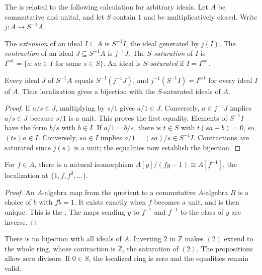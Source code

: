 The  is related to the
following calculation for arbitrary ideals. Let $A$ be commutative and
unital, and let $S$ contain $1$ and be multiplicatively closed.
Write $j:A\to S^{-1}A$.

\begin{definition}\label{ideal-extension-contraction}
The \emph{extension} of an ideal $I\subseteq A$ is $S^{-1}I$, the ideal
generated by $j(I)$. The \emph{contraction} of an ideal $J\subseteq S^{-1}A$
is $j^{-1}J$. The \emph{$S$-saturation} of $I$ is
$I^{\mathrm{sat}}=\{a:sa\in I\text{ for some }s\in S\}$.
An ideal is \emph{$S$-saturated} if $I=I^{\mathrm{sat}}$.
\end{definition}
\begin{proposition}\label{localized-ideals}
Every ideal $J$ of $S^{-1}A$ equals $S^{-1}(j^{-1}J)$, and
$j^{-1}(S^{-1}I)=I^{\mathrm{sat}}$ for every ideal $I$ of $A$.
Thus localization gives a bijection with the $S$-saturated ideals of $A$.
\end{proposition}
\begin{proof}\label{localized-ideals-proof}
If $a/s\in J$, multiplying by $s/1$ gives $a/1\in J$.
Conversely, $a\in j^{-1}J$ implies $a/s\in J$ because $s/1$ is a unit.
This proves the first equality. Elements of $S^{-1}I$ have the form
$b/s$ with $b\in I$. If $a/1=b/s$, there is $t\in S$ with
$t(sa-b)=0$, so $(ts)a\in I$. Conversely, $sa\in I$ implies
$a/1=(sa)/s\in S^{-1}I$. Contractions are saturated since $j(s)$
is a unit; the equalities now establish the bijection.
\end{proof}
\begin{proposition}\label{adjoin-inverse}
For $f\in A$, there is a natural isomorphism
$A[y]/(fy-1)\cong A[f^{-1}]$, the localization at $\{1,f,f^2,\ldots\}$.
\end{proposition}
\begin{proof}\label{adjoin-inverse-proof}
An $A$-algebra map from the quotient to a commutative $A$-algebra $B$
is a choice of $b$ with $fb=1$. It exists exactly when $f$ becomes a
unit, and is then unique. This is the
. The maps sending
$y$ to $f^{-1}$ and $f^{-1}$ to the class of $y$ are inverse.
\end{proof}
\begin{remark}\label{localized-ideals-scope}
There is no bijection with all ideals of $A$. Inverting $2$ in
$\mathbb Z$ makes $(2)$ extend to the whole ring, whose contraction
is $\mathbb Z$, the saturation of $(2)$. The propositions allow zero
divisors. If $0\in S$, the localized ring is zero and the equalities
remain valid.
\end{remark}
